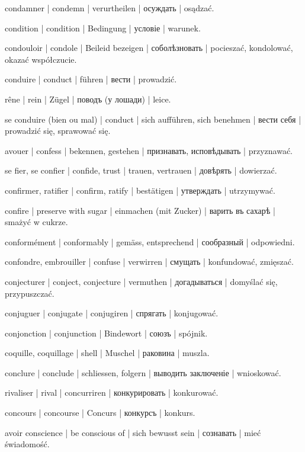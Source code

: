 \begin{outdent}{1em}
condamner | condemn | verurtheilen | осуждать | osądzać.

condition | condition | Bedingung | условіе | warunek.

condouloir | condole | Beileid bezeigen | соболѣзновать | pocieszać, kondolować, okazać współczucie.

conduire | conduct | führen | вести | prowadzić.

\uvsubentry{}
rêne | rein | Zügel | поводъ (у лошади) | leice.

se conduire (bien ou mal) | conduct | sich aufführen, sich
benehmen | вести себя | prowadzić się, sprawować się.

avouer | confess | bekennen, gestehen | признавать,
исповѣдывать | przyznawać.

se fier, se confier | confide, trust | trauen, vertrauen | довѣрять | dowierzać.

confirmer, ratifier | confirm, ratify | bestätigen | утверждать | utrzymywać.

confire | preserve with sugar | einmachen (mit Zucker) | варить въ сахарѣ | smażyć w cukrze.

conformément | conformably | gemäss, entsprechend | сообразный | odpowiedni.

confondre, embrouiller | confuse | verwirren | смущать | konfundować, zmięszać.

conjecturer | conject, conjecture | vermuthen | догадываться | domyślać się, przypuszczać.

conjuguer | conjugate | conjugiren | спрягать | konjugować.

conjonction | conjunction | Bindewort | союзъ | spójnik.

coquille, coquillage | shell | Muschel | раковина | muszla.

conclure | conclude | schliessen, folgern | выводить
заключеніе | wnioskować.

rivaliser | rival | concurriren | конкурировать | konkurować.

concours | concourse | Concurs | конкурсъ | konkurs.

avoir conscience | be conscious of | sich bewusst sein | сознавать | mieć świadomość.


\end{outdent}
